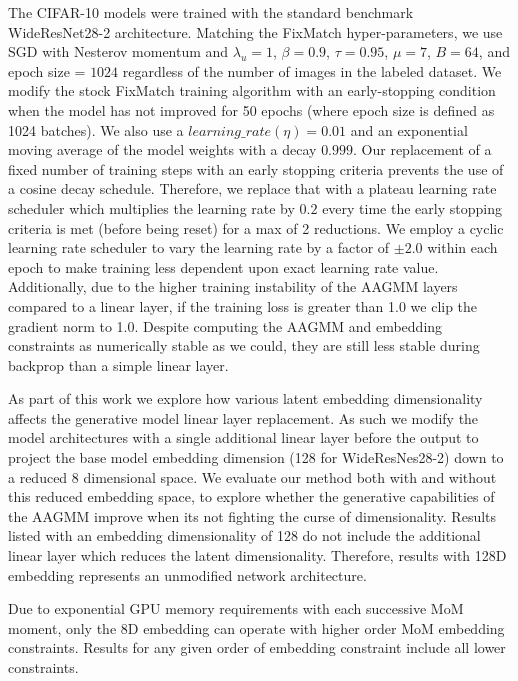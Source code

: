 \documentclass[10pt,twocolumn,letterpaper]{article}
\begin{document}
The CIFAR-10 models were trained with the standard benchmark WideResNet28-2 architecture.
Matching the FixMatch \cite{sohn2020fixmatch} hyper-parameters, we use SGD with Nesterov momentum and $\lambda_u = 1$, $\beta = 0.9$, $\tau = 0.95$, $\mu = 7$, $B = 64$, and epoch size = $1024$ regardless of the number of images in the labeled dataset.
We modify the stock FixMatch \cite{sohn2020fixmatch} training algorithm with an early-stopping condition when the model has not improved for 50 epochs (where epoch size is defined as 1024 batches).
We also use a $learning\_rate (\eta) = 0.01$ and an exponential moving average of the model weights with a decay $0.999$.
Our replacement of a fixed number of training steps with an early stopping criteria prevents the use of a cosine decay schedule.
Therefore, we replace that with a plateau learning rate scheduler which multiplies the learning rate by $0.2$ every time the early stopping criteria is met (before being reset) for a max of 2 reductions.
We employ a cyclic learning rate scheduler to vary the learning rate by a factor of $\pm2.0$ within each epoch to make training less dependent upon exact learning rate value.
Additionally, due to the higher training instability of the AAGMM layers compared to a linear layer, if the training loss is greater than 1.0 we clip the gradient norm to 1.0.
Despite computing the AAGMM and embedding constraints as numerically stable as we could, they are still less stable during backprop than a simple linear layer.

As part of this work we explore how various latent embedding dimensionality affects the generative model linear layer replacement.
As such we modify the model architectures with a single additional linear layer before the output to project the base model embedding dimension (128 for WideResNes28-2) down to a reduced 8 dimensional space.
We evaluate our method both with and without this reduced embedding space, to explore whether the generative capabilities of the AAGMM improve when its not fighting the curse of dimensionality.
Results listed with an embedding dimensionality of 128 do not include the additional linear layer which reduces the latent dimensionality. 
Therefore, results with 128D embedding represents an unmodified network architecture.

Due to exponential GPU memory requirements with each successive MoM moment, only the 8D embedding can operate with higher order MoM embedding constraints. Results for any given order of embedding constraint include all lower constraints.
\end{document}
